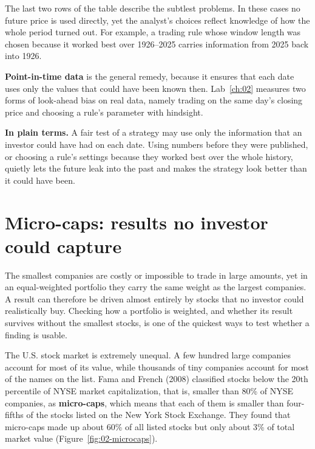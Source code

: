The last two rows of the table describe the subtlest problems. In these cases no future price is used directly, yet the analyst's choices reflect knowledge of how the whole period turned out. For example, a trading rule whose window length was chosen because it worked best over 1926--2025 carries information from 2025 back into 1926.

\textbf{Point-in-time data} is the general remedy, because it ensures that each date uses only the values that could have been known then. Lab~\ref{ch:02} measures two forms of look-ahead bias on real data, namely trading on the same day's closing price and choosing a rule's parameter with hindsight.

\noindent\textbf{In plain terms.} A fair test of a strategy may use only the information that an investor could have had on each date. Using numbers before they were published, or choosing a rule's settings because they worked best over the whole history, quietly lets the future leak into the past and makes the strategy look better than it could have been.

\section{Micro-caps: results no investor could capture}
\label{sec:02-microcaps}

The smallest companies are costly or impossible to trade in large amounts, yet in an equal-weighted portfolio they carry the same weight as the largest companies. A result can therefore be driven almost entirely by stocks that no investor could realistically buy. Checking how a portfolio is weighted, and whether its result survives without the smallest stocks, is one of the quickest ways to test whether a finding is usable.

The U.S. stock market is extremely unequal. A few hundred large companies account for most of its value, while thousands of tiny companies account for most of the names on the list. Fama and French (2008) classified stocks below the 20th percentile of NYSE market capitalization, that is, smaller than 80\% of NYSE companies, as \textbf{micro-caps}, which means that each of them is smaller than four-fifths of the stocks listed on the New York Stock Exchange. They found that micro-caps made up about 60\% of all listed stocks but only about 3\% of total market value (Figure~\ref{fig:02-microcaps}).



